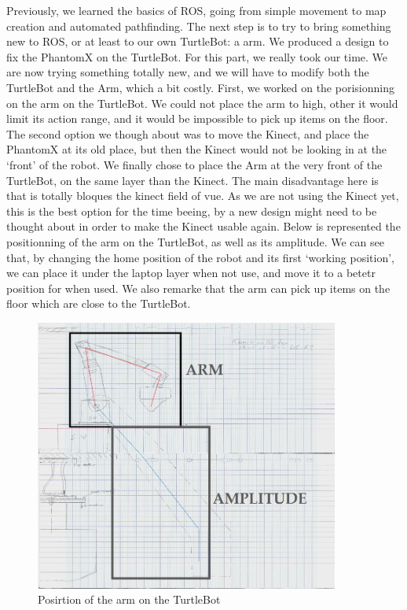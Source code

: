 \documentclass[aps,letterpaper,11pt]{revtex4}
\begin{document}
Previously, we learned the basics of ROS, going from simple movement to map creation and automated pathfinding. The next step is to try to bring something new to ROS, or at least to our own TurtleBot: a arm.
We produced a design to fix the PhantomX on the TurtleBot. For this part, we really took our time. We are now trying something totally new, and we will have to modify both the TurtleBot and the Arm, which a bit costly.
First, we worked on the porisionning on the arm on the TurtleBot. We could not place the arm to high, other it would limit its action range, and it would be impossible to pick up items on the floor. The second option we though about was to move the Kinect, and place the PhantomX at its old place, but then the Kinect would not be looking in at the `front' of the robot.
We finally chose to place the Arm at the very front of the TurtleBot, on the same layer than the Kinect. The main disadvantage here is that is totally bloques the kinect field of vue. As we are not using the Kinect yet, this is the best option for the time beeing, by a new design might need to be thought about in order to make the Kinect usable again. 
Below is represented the positionning of the arm on the TurtleBot, as well as its amplitude. We can see that, by changing the home position of the robot and its first `working position', we can place it under the laptop layer when not use, and move it to a betetr position for when used. We also remarke that the arm can pick up items on the floor which are close to the TurtleBot. 

\begin{figure}[H]
	\centering
	\includegraphics[width=10cm]{armFront.png}
	\caption{Posirtion of the arm on the TurtleBot}
	\label{fig: map}    
\end{figure} 
\end{document}

